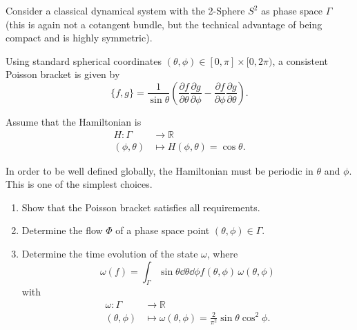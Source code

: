 \begin{Problem}

Consider a classical dynamical system with the 2-Sphere $S^2$ as phase space $\Gamma$ (this is again not a cotangent bundle, but the technical advantage of being compact and is highly symmetric).

Using standard spherical coordinates $(\theta, \phi) \in [0, \pi] \times [0, 2\pi)$, a consistent Poisson bracket is given by
\begin{equation}
	\{f,g\} = \frac{1}{\sin \theta} \left(\frac{\partial f}{\partial \theta} \frac{\partial g}{\partial \phi}- \frac{\partial f}{\partial \phi} \frac{\partial g}{\partial \theta} \right).
\end{equation}

Assume that the Hamiltonian is
\begin{align}
	H : \Gamma &\to \mathbb{R} \nonumber \\
	(\phi, \theta) &\mapsto H(\phi, \theta) = \cos \theta.
\end{align}

In order to be well defined globally, the Hamiltonian must be periodic in $\theta$ and $\phi$. This is one of the simplest choices.

\begin{enumerate}
	\item Show that the Poisson bracket satisfies all requirements.
	\item Determine the flow $\Phi$ of a phase space point $(\theta, \phi) \in \Gamma$.
	\item Determine the time evolution of the state $\omega$, where
	\begin{equation}
		\omega(f) = \int_{\Gamma}\sin\theta \dd{\theta}\dd{\phi} f(\theta, \phi) \, \omega(\theta, \phi)
	\end{equation}
	with
	\begin{align}
		\omega : \Gamma &\to \mathbb{R}\nonumber\\
		(\theta, \phi) &\mapsto \omega(\theta, \phi) = \frac{2}{\pi^2} \sin \theta \cos^2 \phi.
	\end{align}
\end{enumerate}
\end{Problem}
